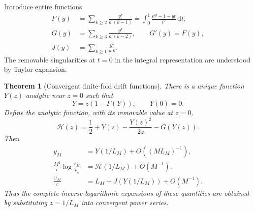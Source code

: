 \documentclass[11pt,a4paper]{article}
\numberwithin{equation}{section}
\newtheorem{theorem}{Theorem}[section]
\theoremstyle{definition}
\theoremstyle{remark}
\newcommand{\dd}{\,\mathrm d}
\newcommand{\rhoc}{\rho_{\mathrm c}}
\begin{document}
Introduce entire functions
\begin{align}
 F(y)&=\sum_{k\ge2}\frac{y^k}{k!(k-1)}
      =\int_0^1\frac{e^{yt}-1-yt}{t^2}\dd t,\label{eq:F}\\
 G(y)&=\sum_{k\ge3}\frac{y^k}{k!(k-2)},\qquad G'(y)=F(y),\label{eq:G}\\
 J(y)&=\sum_{k\ge1}\frac{y^k}{k!k}.
 \label{eq:J}
\end{align}
The removable singularities at $t=0$ in the integral representation are
understood by Taylor expansion.

\begin{theorem}[Convergent finite-fold drift functions]
\label{thm:foldchart}
There is a unique function $Y(z)$ analytic near $z=0$ such that
\begin{equation}\label{eq:Y}
 Y=z(1-F(Y)),\qquad Y(0)=0.
\end{equation}
Define the analytic function, with its removable value at $z=0$,
\begin{equation}\label{eq:H}
 \mathcal H(z)=\frac12+Y(z)-\frac{Y(z)^2}{2z}-G(Y(z)).
\end{equation}
Then
\begin{align}
 y_M&=Y(1/L_M)+O((M L_M)^{-1}),\label{eq:yM}\\
 \frac{M^2}{c}\log\frac{r_M}{\rhoc}
     &=\mathcal H(1/L_M)+O(M^{-1}),\label{eq:rM}\\
 \frac{\mathcal V_M}{c}
     &=L_M+J(Y(1/L_M))+O(M^{-1}).\label{eq:VM}
\end{align}
Thus the complete inverse-logarithmic expansions of these quantities
are obtained by substituting $z=1/L_M$ into convergent power series.
\end{theorem}
\end{document}
